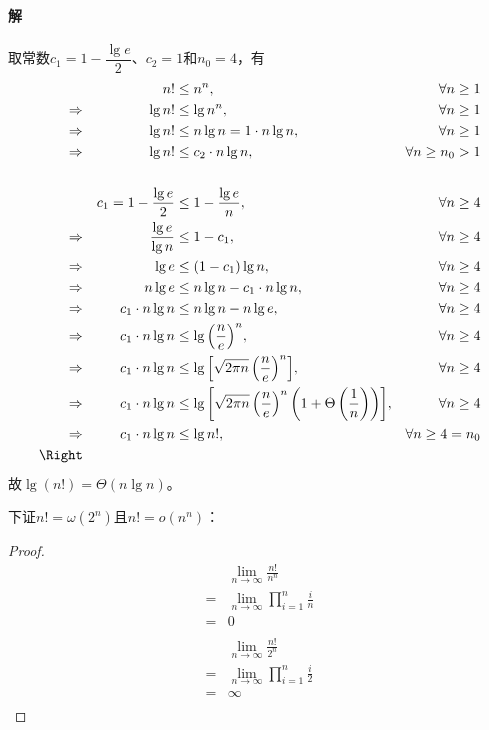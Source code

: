 \documentclass{article}
\begin{document}
\paragraph{解}
取常数$c_1 = 1 - \dfrac{\lg{e}}{2}$、$c_2 = 1$和$n_0 = 4$，有
\begin{align*}
    && n! &\leq n^n, & \forall n \geq 1 \\
    \Rightarrow && \lg{n!} &\leq \lg{n^n}, & \forall n \geq 1 \\
    \Rightarrow && \lg{n!} &\leq n \lg{n} = 1 \cdot n \lg{n}, & \forall n \geq 1 \\
    \Rightarrow && \lg{n!} &\leq c_2 \cdot n \lg{n}, & \forall n \geq n_0 > 1 \\
    \\
    && c_1 = 1 - \frac{\lg{e}}{2} &\leq 1 - \dfrac{\lg{e}}{n}, & \forall n \geq 4 \\
    \Rightarrow && \frac{\lg{e}}{\lg{n}} &\leq 1 - c_1, & \forall n \geq 4 \\
    \Rightarrow && \lg{e} &\leq (1-c_1)\lg{n}, & \forall n \geq 4 \\
    \Rightarrow && n\lg{e} &\leq n \lg{n} - c_1 \cdot n\lg{n}, & \forall n \geq 4 \\
    \Rightarrow && c_1 \cdot n \lg{n} &\leq n\lg{n}-n\lg{e}, & \forall n \geq 4 \\
    \Rightarrow && c_1 \cdot n \lg{n} &\leq \lg{\left(\frac{n}{e}\right)^n}, & \forall n \geq 4 \\
    \Rightarrow && c_1 \cdot n \lg{n} &\leq \lg{\left[\sqrt{2 \pi n}\left(\frac{n}{e}\right)^n\right]}, & \forall n \geq 4 \\
    \Rightarrow && c_1 \cdot n \lg{n} &\leq \lg{\left[\sqrt{2 \pi n}\left(\frac{n}{e}\right)^n \left(1+\Theta \left(\frac{1}{n}\right) \right)\right]}, & \forall n \geq 4 \\
    \Rightarrow && c_1 \cdot n \lg{n} &\leq \lg{n!}, & \forall n \geq 4 = n_0 \\
    \Right
\end{align*}
故$\lg{(n!)}=\Theta(n \lg{n})$。\par
下证$n!=\omega (2^n)$且$n!=o(n^n)$：
\begin{proof}
\begin{align*}
    & \lim_{n \to \infty}{\frac{n!}{n^n}} \\
    =& \lim_{n \to \infty}{\prod_{i=1}^n{\frac{i}{n}}} \\
    =& 0 \\
    \\
    & \lim_{n \to \infty}{\frac{n!}{2^n}} \\
    =& \lim_{n \to \infty}{\prod_{i=1}^n{\frac{i}{2}}} \\
    =& \infty \\
\end{align*}
\end{proof}
\\
\end{document}
